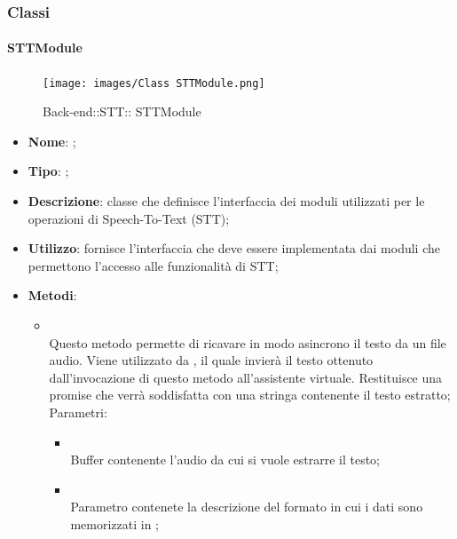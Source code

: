 \subsubsection{Classi}
\hypertarget{ STTModule_label}{\paragraph{ STTModule}}
\begin{figure}[h]
	\centering
	\texttt{[image: images/Class STTModule.png]}
	\caption{Back-end::STT:: STTModule}
\end{figure}
\begin{itemize}
	\item \textbf{Nome}: ;
	\item \textbf{Tipo}: ;
	\item \textbf{Descrizione}: classe che definisce l'interfaccia dei moduli utilizzati per le operazioni di Speech-To-Text (STT);
	\item \textbf{Utilizzo}: fornisce l'interfaccia che deve essere implementata dai moduli che permettono l'accesso alle funzionalità di STT;
	\item \textbf{Metodi}:
	\begin{itemize}
		\item[]  \\
		Questo metodo permette di ricavare in modo asincrono il testo da un file audio. Viene utilizzato da , il quale invierà il testo ottenuto dall'invocazione di questo metodo all'assistente virtuale. Restituisce una promise che verrà soddisfatta con una stringa contenente il testo estratto;\\
		Parametri:
		\begin{itemize}
			\item {} \\
			Buffer contenente l'audio da cui si vuole estrarre il testo;
			\item {} \\
			Parametro contenete la descrizione del formato in cui i dati sono memorizzati in ;
		\end{itemize}
	\end{itemize}
\end{itemize}
\FloatBarrier

